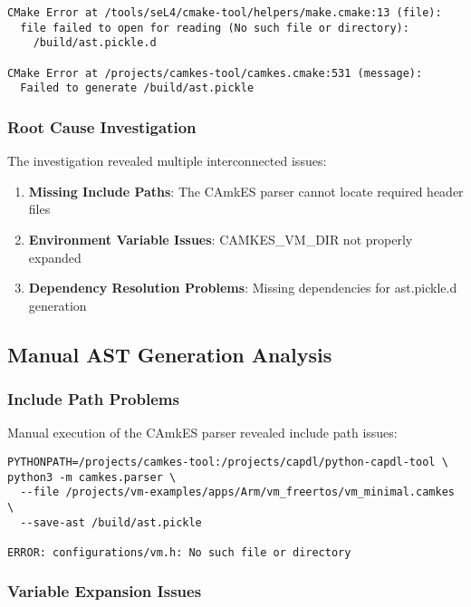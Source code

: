 \documentclass[11pt,a4paper]{article}
\begin{document}
\begin{lstlisting}[caption=AST Generation Error]
CMake Error at /tools/seL4/cmake-tool/helpers/make.cmake:13 (file):
  file failed to open for reading (No such file or directory):
    /build/ast.pickle.d

CMake Error at /projects/camkes-tool/camkes.cmake:531 (message):
  Failed to generate /build/ast.pickle
\end{lstlisting}

\subsubsection{Root Cause Investigation}

The investigation revealed multiple interconnected issues:

\begin{enumerate}
\item \textbf{Missing Include Paths}: The CAmkES parser cannot locate required header files
\item \textbf{Environment Variable Issues}: CAMKES\_VM\_DIR not properly expanded
\item \textbf{Dependency Resolution Problems}: Missing dependencies for ast.pickle.d generation
\end{enumerate}

\subsection{Manual AST Generation Analysis}

\subsubsection{Include Path Problems}

Manual execution of the CAmkES parser revealed include path issues:

\begin{lstlisting}[caption=Manual AST Generation Attempt]
PYTHONPATH=/projects/camkes-tool:/projects/capdl/python-capdl-tool \
python3 -m camkes.parser \
  --file /projects/vm-examples/apps/Arm/vm_freertos/vm_minimal.camkes \
  --save-ast /build/ast.pickle

ERROR: configurations/vm.h: No such file or directory
\end{lstlisting}

\subsubsection{Variable Expansion Issues}
\end{document}

